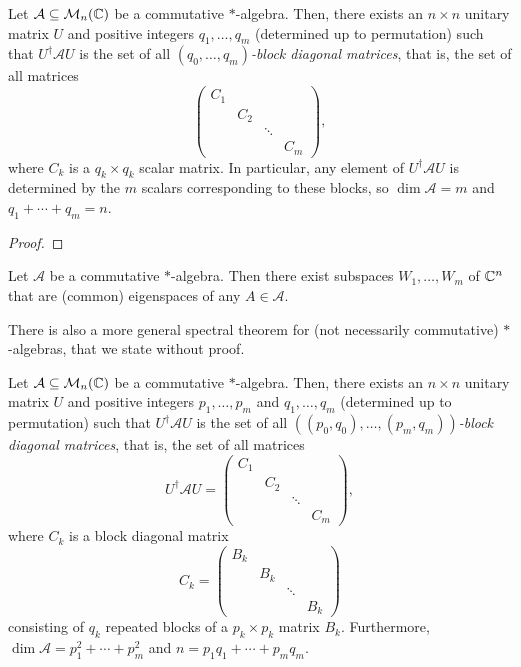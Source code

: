 	\begin{ftheo}
		Let $\mathcal{A} \subseteq \mathcal{M}_n(\mathbb{C})$ be a commutative $*$-algebra. Then, there exists an $n \times n$ unitary matrix $U$ and positive integers $q_1,\ldots,q_m$ (determined up to permutation) such that $U^\dagger \mathcal{A} U$ is the set of all \emph{$(q_0,\ldots,q_m)$-block diagonal matrices}, that is, the set of all matrices
		\[ \begin{pmatrix} C_1 & & & \\ & C_2 & & \\ & & \ddots & \\ & & & C_m \end{pmatrix}, \]
		where $C_k$ is a $q_k \times q_k$ scalar matrix. In particular, any element of $U^\dagger \mathcal{A} U$ is determined by the $m$ scalars corresponding to these blocks, so $\dim \mathcal{A} = m$ and $q_1 + \cdots + q_m = n$.
	\end{ftheo}
	\begin{proof}
		
	\end{proof}

	\begin{corollary}
		Let $\mathcal{A}$ be a commutative $*$-algebra. Then there exist subspaces $W_1,\ldots,W_m$ of $\mathbb{C}^n$ that are (common) eigenspaces of any $A \in \mathcal{A}$.
	\end{corollary}

	There is also a more general spectral theorem for (not necessarily commutative) $*$-algebras, that we state without proof.

	\begin{ftheo}
		\label{theo:noncomm-spec-thm}
		Let $\mathcal{A} \subseteq \mathcal{M}_n(\mathbb{C})$ be a commutative $*$-algebra. Then, there exists an $n \times n$ unitary matrix $U$ and positive integers $p_1,\ldots,p_m$ and $q_1,\ldots,q_m$ (determined up to permutation) such that $U^\dagger \mathcal{A} U$ is the set of all \emph{$((p_0,q_0),\ldots,(p_m,q_m))$-block diagonal matrices}, that is, the set of all matrices
		\[ U^\dagger \mathcal{A} U = \begin{pmatrix} C_1 & & & \\ & C_2 & & \\ & & \ddots & \\ & & & C_m \end{pmatrix}, \]
		where $C_k$ is a block diagonal matrix
		\[ C_k = \begin{pmatrix} B_k & & & \\ & B_k & & \\ & & \ddots & \\ & & & B_k \end{pmatrix} \]
		consisting of $q_k$ repeated blocks of a $p_k \times p_k$ matrix $B_k$.	
		Furthermore, $\dim \mathcal{A} = p_1^2 + \cdots + p_m^2$ and $n = p_1q_1 + \cdots + p_mq_m$.
	\end{ftheo}


